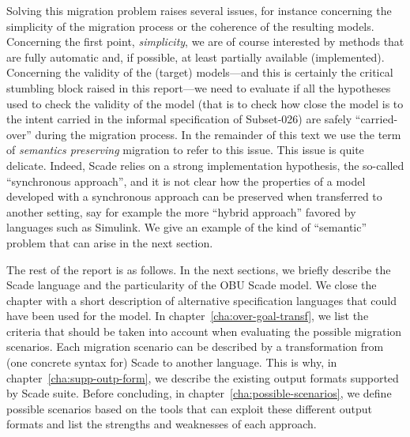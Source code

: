\documentclass{template/openetcs_report}
\begin{document}
Solving this migration problem raises several issues, for instance
concerning the simplicity of the migration process or the coherence of
the resulting models. Concerning the first point, \emph{simplicity},
we are of course interested by methods that are fully automatic and,
if possible, at least partially available (implemented). Concerning
the validity of the (target) models---and this is certainly the
critical stumbling block raised in this report---we need to evaluate
if all the hypotheses used to check the validity of the model (that is
to check how close the model is to the intent carried in the informal
specification of Subset-026) are safely ``carried-over'' during the
migration process. In the remainder of this text we use the term of
\emph{semantics preserving} migration to refer to this issue. This
issue is quite delicate. Indeed, Scade relies on a strong
implementation hypothesis, the so-called ``synchronous approach'', and
it is not clear how the properties of a model developed with a
synchronous approach can be preserved when transferred to another
setting, say for example the more ``hybrid approach'' favored by
languages such as Simulink. We give an example of the kind of
``semantic'' problem that can arise in the next section.

The rest of the report is as follows. In the next sections, we briefly
describe the Scade language and the particularity of the OBU Scade
model. We close the chapter with a short description of alternative
specification languages that could have been used for the model. In
chapter~\ref{cha:over-goal-transf}, we list the criteria that should
be taken into account when evaluating the possible migration
scenarios. Each migration scenario can be described by a
transformation from (one concrete syntax for) Scade to another
language. This is why, in chapter~\ref{cha:supp-outp-form}, we
describe the existing output formats supported by Scade suite. Before
concluding, in chapter~\ref{cha:possible-scenarios}, we define
possible scenarios based on the tools that can exploit these different
output formats and list the strengths and weaknesses of each approach.



\end{document}
